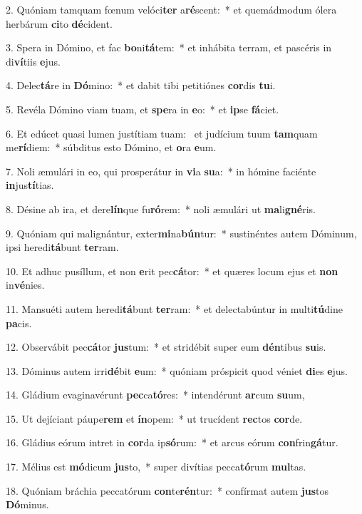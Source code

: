 2. Quóniam tamquam fœnum velóci\textbf{ter} a\textbf{ré}scent:~*  et quemádmodum ólera herbárum \textbf{ci}to \textbf{dé}cident.\

3. Spera in Dómino, et fac \textbf{bo}ni\textbf{tá}tem:~*  et inhábita terram, et pascéris in di\textbf{ví}tiis \textbf{e}jus.\

4. Delec\textbf{tá}re in \textbf{Dó}mino:~*  et dabit tibi petitiónes \textbf{cor}dis \textbf{tu}i.\

5. Revéla Dómino viam tuam, et \textbf{spe}ra in \textbf{e}o:~*  et \textbf{ip}se \textbf{fá}ciet.\

6. Et edúcet quasi lumen justítiam tuam: \dag\  et judícium tuum \textbf{tam}quam me\textbf{rí}diem:~*  súbditus esto Dómino, et \textbf{o}ra \textbf{e}um.\

7. Noli æmulári in eo, qui prosperátur in \textbf{vi}a \textbf{su}a:~*  in hómine faciénte \textbf{in}jus\textbf{tí}tias.\

8. Désine ab ira, et dere\textbf{lín}que fu\textbf{ró}rem:~*  noli æmulári ut \textbf{ma}li\textbf{gné}ris.\

9. Quóniam qui malignántur, exter\textbf{mi}na\textbf{bún}tur:~*  sustinéntes autem Dóminum, ipsi heredi\textbf{tá}bunt \textbf{ter}ram.\

10. Et adhuc pusíllum, et non \textbf{e}rit pec\textbf{cá}tor:~*  et quæres locum ejus et \textbf{non} in\textbf{vé}nies.\

11. Mansuéti autem heredi\textbf{tá}bunt \textbf{ter}ram:~*  et delectabúntur in multi\textbf{tú}dine \textbf{pa}cis.\

12. Observábit pec\textbf{cá}tor \textbf{jus}tum:~*  et stridébit super eum \textbf{dén}tibus \textbf{su}is.\

13. Dóminus autem irri\textbf{dé}bit \textbf{e}um:~*  quóniam próspicit quod véniet \textbf{di}es \textbf{e}jus.\

14. Gládium evaginavérunt \textbf{pec}ca\textbf{tó}res:~*  intendérunt \textbf{ar}cum \textbf{su}um,\

15. Ut dejíciant páupe\textbf{rem} et \textbf{ín}opem:~*  ut trucídent \textbf{rec}tos \textbf{cor}de.\

16. Gládius eórum intret in \textbf{cor}da ip\textbf{só}rum:~*  et arcus eórum \textbf{con}frin\textbf{gá}tur.\

17. Mélius est \textbf{mó}dicum \textbf{jus}to,~*  super divítias pecca\textbf{tó}rum \textbf{mul}tas.\

18. Quóniam bráchia peccatórum \textbf{con}te\textbf{rén}tur:~*  confírmat autem \textbf{jus}tos \textbf{Dó}minus.\

